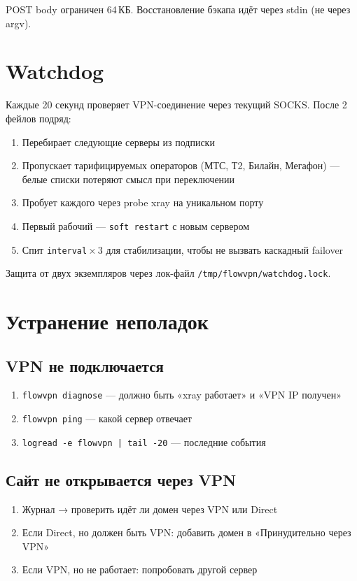 \documentclass[11pt,a4paper]{article}
\begin{document}
POST body ограничен 64\,КБ. Восстановление бэкапа идёт через stdin (не через argv).

\section{Watchdog}

Каждые 20 секунд проверяет VPN-соединение через текущий SOCKS. После 2 фейлов подряд:

\begin{enumerate}
\item Перебирает следующие серверы из подписки
\item Пропускает тарифицируемых операторов (МТС, Т2, Билайн, Мегафон) — белые списки потеряют смысл при переключении
\item Пробует каждого через probe xray на уникальном порту
\item Первый рабочий — \texttt{soft restart} с новым сервером
\item Спит \texttt{interval}\,×\,3 для стабилизации, чтобы не вызвать каскадный failover
\end{enumerate}

Защита от двух экземпляров через лок-файл \texttt{/tmp/flowvpn/watchdog.lock}.

\section{Устранение неполадок}

\subsection{VPN не подключается}

\begin{enumerate}
\item \texttt{flowvpn diagnose} — должно быть «xray работает» и «VPN IP получен»
\item \texttt{flowvpn ping} — какой сервер отвечает
\item \texttt{logread -e flowvpn | tail -20} — последние события
\end{enumerate}

\subsection{Сайт не открывается через VPN}

\begin{enumerate}
\item Журнал → проверить идёт ли домен через VPN или Direct
\item Если Direct, но должен быть VPN: добавить домен в «Принудительно через VPN»
\item Если VPN, но не работает: попробовать другой сервер
\end{enumerate}
\end{document}
